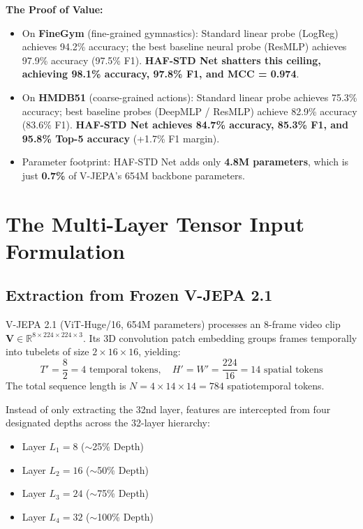 \documentclass[a4paper, 11pt]{article}
\begin{document}
\begin{tipbox}
\textbf{The Proof of Value:}
\begin{itemize}
    \item On \textbf{FineGym} (fine-grained gymnastics): Standard linear probe (LogReg) achieves 94.2\% accuracy; the best baseline neural probe (ResMLP) achieves 97.9\% accuracy (97.5\% F1). \textbf{HAF-STD Net shatters this ceiling, achieving 98.1\% accuracy, 97.8\% F1, and MCC = 0.974}.
    \item On \textbf{HMDB51} (coarse-grained actions): Standard linear probe achieves 75.3\% accuracy; best baseline probes (DeepMLP / ResMLP) achieve 82.9\% accuracy (83.6\% F1). \textbf{HAF-STD Net achieves 84.7\% accuracy, 85.3\% F1, and 95.8\% Top-5 accuracy} (+1.7\% F1 margin).
    \item Parameter footprint: HAF-STD Net adds only \textbf{4.8M parameters}, which is just \textbf{0.7\%} of V-JEPA's 654M backbone parameters.
\end{itemize}
\end{tipbox}

\vspace{0.3cm}

\section{The Multi-Layer Tensor Input Formulation}

\subsection{Extraction from Frozen V-JEPA 2.1}
V-JEPA 2.1 (ViT-Huge/16, 654M parameters) processes an 8-frame video clip $\mathbf{V} \in \mathbb{R}^{8 \times 224 \times 224 \times 3}$. Its 3D convolution patch embedding groups frames temporally into tubelets of size $2 \times 16 \times 16$, yielding:
\begin{equation}
    T' = \frac{8}{2} = 4 \text{ temporal tokens}, \quad H' = W' = \frac{224}{16} = 14 \text{ spatial tokens}
\end{equation}
The total sequence length is $N = 4 \times 14 \times 14 = 784$ spatiotemporal tokens.

Instead of only extracting the 32nd layer, features are intercepted from four designated depths across the 32-layer hierarchy:
\begin{itemize}
    \item Layer $L_1 = 8$ ($\sim$25\% Depth)
    \item Layer $L_2 = 16$ ($\sim$50\% Depth)
    \item Layer $L_3 = 24$ ($\sim$75\% Depth)
    \item Layer $L_4 = 32$ ($\sim$100\% Depth)
\end{itemize}
\end{document}
